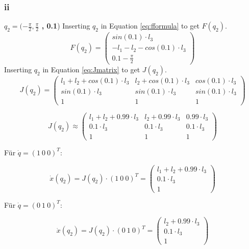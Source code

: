 \subsubsection{ii}
\textbf{$q_2=(-\frac{\pi}{2}, \frac{\pi}{2}$ , 0.1})
\newline 
Inserting $q_2$ in Equation \ref{eq:fformula} to get $F(q_2)$.
\begin{equation}
    F(q_2) = \begin{pmatrix} 
   sin(0.1)\cdot l_3\\
  -l_1 - l_2 - cos(0.1)\cdot l_3\\
  0.1-\frac{\pi}{2}  \end{pmatrix}
\end{equation}
Inserting $q_2$ in Equation \ref{eq:Jmatrix} to get $J(q_2)$.
\begin{equation}
    J(q_2) = \begin{pmatrix} 
   l_1 + l_2 + cos(0.1)\cdot l_3& l_2 + cos(0.1)\cdot l_3& cos(0.1)\cdot l_3\\
  sin(0.1)\cdot l_3& sin(0.1)\cdot l_3& sin(0.1)\cdot l_3\\
  1  & 1 & 1\end{pmatrix}
\end{equation}

\begin{equation}
    J(q_2) \approx \begin{pmatrix} 
   l_1 + l_2 + 0.99\cdot l_3& l_2 + 0.99\cdot l_3& 0.99\cdot l_3\\
  0.1\cdot l_3& 0.1\cdot l_3& 0.1\cdot l_3\\
  1  & 1 & 1\end{pmatrix}
\end{equation}


Für $\dot{q}=(1\ 0\ 0)^T$:

\begin{equation}
    \dot{x}(q_2)=J(q_2)\cdot (1\ 0\ 0)^T = \begin{pmatrix} 
  l_1 + l_2 + 0.99\cdot l_3\\
  0.1\cdot l_3\\
  1\end{pmatrix}
\end{equation}

Für $\dot{q}=(0\ 1\ 0)^T$:

\begin{equation}
    \dot{x}(q_2)=J(q_2)\cdot (0\ 1\ 0)^T = \begin{pmatrix} 
  l_2+0.99 \cdot l_3\\
  0.1 \cdot l_3\\
  1\end{pmatrix}
\end{equation}

